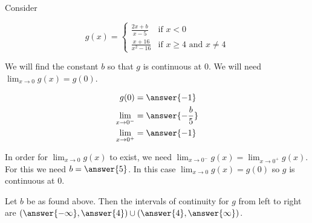 \documentclass{ximera}
\author{Nela Lakos \and Kyle Parsons}
\begin{document}
\begin{exercise}

Consider

\[
g(x) = 
\begin{cases}
\frac{2x+b}{x-5} & \text{if }x<0\\
\frac{x+16}{x^2-16} & \text{if }x\geq4\text{ and }x\neq4
\end{cases}
\]

We will find the constant $b$ so that $g$ is continuous at 0.  We will need $\lim_{x\to0}g(x) = g(0)$.  

\begin{align*}
g(0) &= \answer{-1}\\
\lim_{x\to0^-} &= \answer{-\frac{b}{5}}\\
\lim_{x\to0^+} &= \answer{-1}
\end{align*}

\begin{exercise}

In order for $\lim_{x\to0}g(x)$ to exist, we need $\lim_{x\to0^-}g(x) = \lim_{x\to0^+}g(x)$. For this we need $b = \answer{5}$.  In this case $\lim_{x\to0}g(x) = g(0)$ so $g$ is continuous at 0.

\begin{exercise}

Let $b$ be as found above.  Then the intervals of continuity for $g$ from left to right are $\left(\answer{-\infty},\answer{4}\right)\cup\left(\answer{4},\answer{\infty}\right)$.

\end{exercise}
\end{exercise}
\end{exercise}
\end{document}
